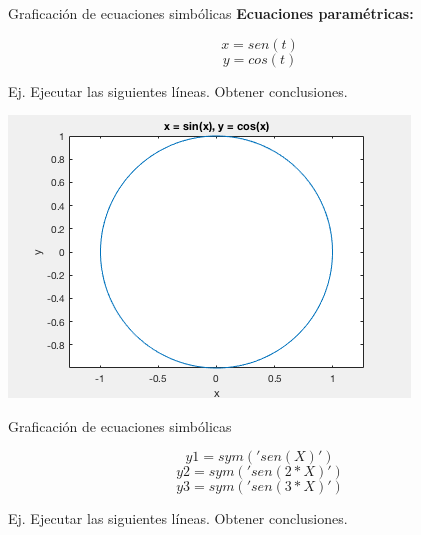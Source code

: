 \documentclass{bredelebeamer}
\begin{document}
\begin{frame}{Graficación de ecuaciones simbólicas}
\textbf{Ecuaciones paramétricas:}
\begin{center}
\begin{equation*}
x = sen(t)
\end{equation*}
\begin{equation*}
y = cos(t)
\end{equation*}
\end{center}
Ej. Ejecutar las siguientes líneas. Obtener conclusiones.

\begin{center}
\includegraphics[scale=0.3]{images/fig4.png}
\end{center}
\end{frame}

\begin{frame}{Graficación de ecuaciones simbólicas}
\begin{center}
\begin{equation*}
y1 = sym('sen(X)') 
\end{equation*}
\begin{equation*}
y2 = sym('sen(2*X)') 
\end{equation*}
\begin{equation*}
y3 = sym('sen(3*X)') 
\end{equation*}
\end{center}
Ej. Ejecutar las siguientes líneas. Obtener conclusiones.

\end{frame}
\end{document}
